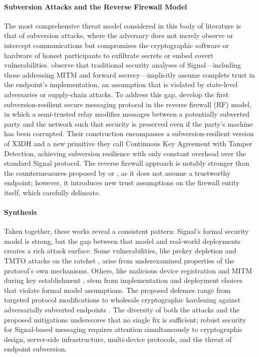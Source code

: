 \paragraph{Subversion Attacks and the Reverse Firewall Model}

The most comprehensive threat model considered in this body of literature is that of subversion attacks, where the adversary does not merely observe or intercept communications but compromises the cryptographic software or hardware of honest participants to exfiltrate secrets or embed covert vulnerabilities. \textcite{dodis2025} observe that traditional security analyses of Signal—including those addressing MITM and forward secrecy—implicitly assume complete trust in the endpoint's implementation, an assumption that is violated by state-level adversaries or supply-chain attacks. To address this gap, \textcite{dodis2025} develop the first subversion-resilient secure messaging protocol in the reverse firewall (RF) model, in which a semi-trusted relay modifies messages between a potentially subverted party and the network such that security is preserved even if the party's machine has been corrupted. Their construction encompasses a subversion-resilient version of X3DH and a new primitive they call Continuous Key Agreement with Tamper Detection, achieving subversion resilience with only constant overhead over the standard Signal protocol. The reverse firewall approach is notably stronger than the countermeasures proposed by \textcite{wichelmann2021} or \textcite{liu2022}, as it does not assume a trustworthy endpoint; however, it introduces new trust assumptions on the firewall entity itself, which \textcite{dodis2025} carefully delineate.

\paragraph{Synthesis}

Taken together, these works reveal a consistent pattern: Signal's formal security model is strong, but the gap between that model and real-world deployments creates a rich attack surface. Some vulnerabilities, like prekey depletion \parencite{gegenhuber2025} and TMTO attacks on the ratchet \parencite{mattsson2023}, arise from underexamined properties of the protocol's own mechanisms. Others, like malicious device registration \parencite{wichelmann2021} and MITM during key establishment \parencite{liu2022}, stem from implementation and deployment choices that violate formal model assumptions. The proposed defenses range from targeted protocol modifications \parencite{wichelmann2021,teng2024,liu2022} to wholesale cryptographic hardening against adversarially subverted endpoints \parencite{dodis2025}. The diversity of both the attacks and the proposed mitigations underscores that no single fix is sufficient; robust security for Signal-based messaging requires attention simultaneously to cryptographic design, server-side infrastructure, multi-device protocols, and the threat of endpoint subversion.

